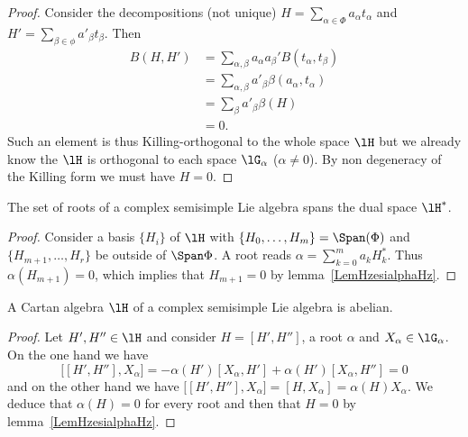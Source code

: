 \begin{proof}
	Consider the decompositions (not unique) \( H=\sum_{\alpha\in\Phi}a_{\alpha} t_{\alpha}\) and \( H'=\sum_{\beta\in\phi}a'_{\beta}t_{\beta}\). Then
	\begin{subequations}
		\begin{align}
			B(H,H') & =\sum_{\alpha,\beta}a_{\alpha}a_{\beta}'B(t_{\alpha},t_{\beta}) \\
			        & =\sum_{\alpha,\beta}a'_{\beta}\beta(a_{\alpha},t_{\alpha})      \\
			        & =\sum_{\beta}a'_{\beta}\beta(H)                                 \\
			        & =0.
		\end{align}
	\end{subequations}
	Such an element is thus Killing-orthogonal to the whole space \( \lH\) but we already know the \( \lH\) is orthogonal to each space \( \lG_{\alpha}\) (\( \alpha\neq 0\)). By non degeneracy of the Killing form we must have \( H=0\).
\end{proof}

\begin{proposition}
	The set of roots of a complex semisimple Lie algebra spans the dual space \( \lH^*\).
\end{proposition}

\begin{proof}
	Consider a basis \( \{ H_i \}\) of \( \lH\) with \( \{ H_0,\ldots,H_m \}=\Span(\Phi)\) and \( \{ H_{m+1},\ldots,H_r \}\) be outside of \( \Span\Phi\). A root reads \( \alpha=\sum_{k=0}^ma_kH_k^*\).
	Thus \( \alpha(H_{m+1})=0\), which implies that \( H_{m+1}=0\) by lemma~\ref{LemHzesialphaHz}.
\end{proof}

\begin{corollary}
	A Cartan algebra \( \lH\) of a complex semisimple Lie algebra is abelian.
\end{corollary}

\begin{proof}
	Let \( H',H''\in\lH\) and consider \( H=[H',H'']\), a root \( \alpha\) and \( X_{\alpha}\in\lG_{\alpha}\). On the one hand we have
	\begin{equation}
		\big[ [H',H''],X_{\alpha} \big]=-\alpha(H')[X_{\alpha},H']+\alpha(H')[X_{\alpha},H'']=0
	\end{equation}
	and on the other hand we have \( \big[ [H',H''],X_{\alpha} \big]=[H,X_{\alpha}]=\alpha(H)X_{\alpha}\). We deduce that \( \alpha(H)=0\) for every root and then that \( H=0\) by lemma~\ref{LemHzesialphaHz}.
\end{proof}

